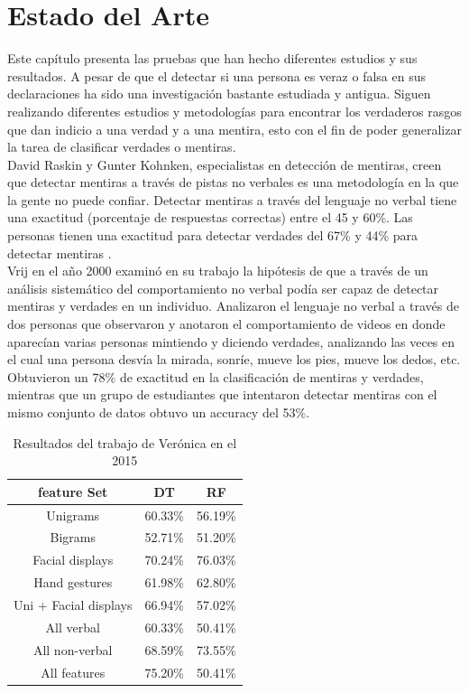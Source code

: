 \chapter{Estado del Arte} %
\label{Chapter3} %
\begin{onehalfspacing}

Este capítulo presenta las pruebas que han hecho diferentes estudios y sus resultados. A pesar de que el detectar si una persona es veraz o falsa en sus declaraciones ha sido una investigación bastante estudiada y antigua. Siguen realizando diferentes estudios y metodologías para encontrar los verdaderos rasgos que dan indicio a una verdad y a una mentira, esto con el fin de poder generalizar la tarea de clasificar verdades o mentiras.\\


David Raskin y Gunter Kohnken, especialistas en detección de mentiras, creen que detectar mentiras a través de pistas no verbales es una metodología en la que la gente no puede confiar. Detectar mentiras a través del lenguaje no verbal tiene una exactitud (porcentaje de respuestas correctas) entre el 45 y 60\%. Las personas tienen una exactitud para detectar verdades del 67\% y 44\% para detectar mentiras \cite{Vrij2000DetectingBehavior,Bond2006AccuracyJudgments}.\\

Vrij en el año 2000 \cite{Vrij2000DetectingBehavior} examinó en su trabajo la hipótesis de que a través de un análisis sistemático del comportamiento no verbal podía ser capaz de detectar mentiras y verdades en un individuo. Analizaron el lenguaje no verbal a través de dos personas que observaron y anotaron el comportamiento de videos en donde aparecían varias personas mintiendo y diciendo verdades, analizando las veces en el cual una persona desvía la mirada, sonríe, mueve los pies, mueve los dedos, etc. Obtuvieron un 78\% de exactitud en la clasificación de mentiras y verdades, mientras que un grupo de estudiantes que intentaron detectar mentiras con el mismo conjunto de datos obtuvo un accuracy del 53\%. \\ 


\begin{table}[h!]
\centering
    \begin{tabular}{|c|c|c|}
        \hline 
        feature Set & DT & RF\tabularnewline
        \hline 
        \hline 
        Unigrams & 60.33\% & 56.19\%\tabularnewline
        Bigrams & 52.71\% & 51.20\%\tabularnewline
        Facial displays & 70.24\% & 76.03\%\tabularnewline
        Hand gestures & 61.98\% & 62.80\%\tabularnewline
        Uni + Facial displays & 66.94\% & 57.02\%\tabularnewline
        \hline 
        All verbal & 60.33\% & 50.41\%\tabularnewline
        All non-verbal & 68.59\% & 73.55\%\tabularnewline
        \hline 
        All features & 75.20\% & 50.41\%\tabularnewline
        \hline 
    \end{tabular}%
	\caption{Resultados del trabajo de Verónica en el 2015}
	\label{tab:Fig_Veronica2015}
\end{table}


\end{onehalfspacing}
